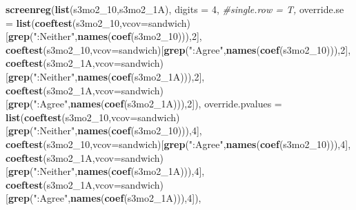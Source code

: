 \documentclass[
]{article}
\newenvironment{Shaded}{\begin{snugshade}}{\end{snugshade}}
\newcommand{\CommentTok}[1]{\textcolor[rgb]{0.56,0.35,0.01}{\textit{#1}}}
\newcommand{\DataTypeTok}[1]{\textcolor[rgb]{0.13,0.29,0.53}{#1}}
\newcommand{\DecValTok}[1]{\textcolor[rgb]{0.00,0.00,0.81}{#1}}
\newcommand{\KeywordTok}[1]{\textcolor[rgb]{0.13,0.29,0.53}{\textbf{#1}}}
\newcommand{\NormalTok}[1]{#1}
\newcommand{\StringTok}[1]{\textcolor[rgb]{0.31,0.60,0.02}{#1}}
\begin{document}
\begin{Shaded}
\begin{Highlighting}[]
\KeywordTok{screenreg}\NormalTok{(}\KeywordTok{list}\NormalTok{(s3mo2_}\DecValTok{10}\NormalTok{,s3mo2_1A), }\DataTypeTok{digits =} \DecValTok{4}\NormalTok{, }\CommentTok{#single.row = T,}
          \DataTypeTok{override.se =} \KeywordTok{list}\NormalTok{(}\KeywordTok{coeftest}\NormalTok{(s3mo2_}\DecValTok{10}\NormalTok{,}\DataTypeTok{vcov=}\NormalTok{sandwich)[}\KeywordTok{grep}\NormalTok{(}\StringTok{":Neither"}\NormalTok{,}\KeywordTok{names}\NormalTok{(}\KeywordTok{coef}\NormalTok{(s3mo2_}\DecValTok{10}\NormalTok{))),}\DecValTok{2}\NormalTok{],}
                             \KeywordTok{coeftest}\NormalTok{(s3mo2_}\DecValTok{10}\NormalTok{,}\DataTypeTok{vcov=}\NormalTok{sandwich)[}\KeywordTok{grep}\NormalTok{(}\StringTok{":Agree"}\NormalTok{,}\KeywordTok{names}\NormalTok{(}\KeywordTok{coef}\NormalTok{(s3mo2_}\DecValTok{10}\NormalTok{))),}\DecValTok{2}\NormalTok{],}
                             \KeywordTok{coeftest}\NormalTok{(s3mo2_1A,}\DataTypeTok{vcov=}\NormalTok{sandwich)[}\KeywordTok{grep}\NormalTok{(}\StringTok{":Neither"}\NormalTok{,}\KeywordTok{names}\NormalTok{(}\KeywordTok{coef}\NormalTok{(s3mo2_1A))),}\DecValTok{2}\NormalTok{],}
                             \KeywordTok{coeftest}\NormalTok{(s3mo2_1A,}\DataTypeTok{vcov=}\NormalTok{sandwich)[}\KeywordTok{grep}\NormalTok{(}\StringTok{":Agree"}\NormalTok{,}\KeywordTok{names}\NormalTok{(}\KeywordTok{coef}\NormalTok{(s3mo2_1A))),}\DecValTok{2}\NormalTok{]),}
          \DataTypeTok{override.pvalues =} \KeywordTok{list}\NormalTok{(}\KeywordTok{coeftest}\NormalTok{(s3mo2_}\DecValTok{10}\NormalTok{,}\DataTypeTok{vcov=}\NormalTok{sandwich)[}\KeywordTok{grep}\NormalTok{(}\StringTok{":Neither"}\NormalTok{,}\KeywordTok{names}\NormalTok{(}\KeywordTok{coef}\NormalTok{(s3mo2_}\DecValTok{10}\NormalTok{))),}\DecValTok{4}\NormalTok{],}
                                  \KeywordTok{coeftest}\NormalTok{(s3mo2_}\DecValTok{10}\NormalTok{,}\DataTypeTok{vcov=}\NormalTok{sandwich)[}\KeywordTok{grep}\NormalTok{(}\StringTok{":Agree"}\NormalTok{,}\KeywordTok{names}\NormalTok{(}\KeywordTok{coef}\NormalTok{(s3mo2_}\DecValTok{10}\NormalTok{))),}\DecValTok{4}\NormalTok{],}
                                  \KeywordTok{coeftest}\NormalTok{(s3mo2_1A,}\DataTypeTok{vcov=}\NormalTok{sandwich)[}\KeywordTok{grep}\NormalTok{(}\StringTok{":Neither"}\NormalTok{,}\KeywordTok{names}\NormalTok{(}\KeywordTok{coef}\NormalTok{(s3mo2_1A))),}\DecValTok{4}\NormalTok{],}
                                  \KeywordTok{coeftest}\NormalTok{(s3mo2_1A,}\DataTypeTok{vcov=}\NormalTok{sandwich)[}\KeywordTok{grep}\NormalTok{(}\StringTok{":Agree"}\NormalTok{,}\KeywordTok{names}\NormalTok{(}\KeywordTok{coef}\NormalTok{(s3mo2_1A))),}\DecValTok{4}\NormalTok{]),}

\end{Highlighting}
\end{Shaded}
\end{document}
